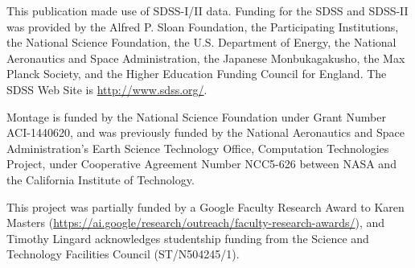 \documentclass[../main.tex]{subfiles}
\begin{document}
\label{sec:acknowledgements}
This publication made use of SDSS-I/II data. Funding for the SDSS and SDSS-II was provided by the Alfred P. Sloan Foundation, the Participating Institutions, the National Science Foundation, the U.S. Department of Energy, the National Aeronautics and Space Administration, the Japanese Monbukagakusho, the Max Planck Society, and the Higher Education Funding Council for England. The SDSS Web Site is \url{http://www.sdss.org/}.

Montage is funded by the National Science Foundation under Grant Number ACI-1440620, and was previously funded by the National Aeronautics and Space Administration's Earth Science Technology Office, Computation Technologies Project, under Cooperative Agreement Number NCC5-626 between NASA and the California Institute of Technology.

This project was partially funded by a Google Faculty Research Award to Karen Masters (\url{https://ai.google/research/outreach/faculty-research-awards/}), and Timothy Lingard acknowledges studentship funding from the Science and Technology Facilities Council (ST/N504245/1).
\end{document}
